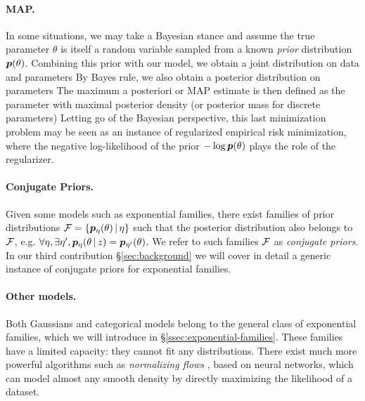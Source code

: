 \paragraph{MAP.}
In some situations, we may take a Bayesian stance and assume the true parameter $\theta$ is itself a random variable sampled from a known \emph{prior} distribution $\bm{p}(\theta)$.
Combining this prior with our model, we obtain a joint distribution on data and parameters
By Bayes rule, we also obtain a posterior distribution on parameters
The maximum a posteriori or MAP estimate is then defined as the parameter with maximal posterior density (or posterior mass for discrete parameters)
Letting go of the Bayesian perspective, this last minimization problem may be seen as an instance of regularized empirical risk minimization, where the negative log-likelihood of the prior $- \log \bm{p}(\theta)$ plays the role of the regularizer.

\paragraph{Conjugate Priors.}
Given some models such as exponential families, there exist families of prior distributions ${\mathcal F} = \{\bm{p}_\eta (\theta) \,\vert\, \eta\}$
such that the posterior distribution also belongs to ${\mathcal F}$,
e.g.  $\forall \eta, \exists \eta', \bm{p}_\eta (\theta \,\vert\, z) = \bm{p}_{\eta'}(\theta)$.
We refer to such families ${\mathcal F}$ as \emph{conjugate priors}.
In our third contribution \S\ref{sec:background} we will cover in detail a generic instance of conjugate priors for exponential families.

\paragraph{Other models.}
Both Gaussians and categorical models belong to the general class of exponential families, which we will introduce in \S\ref{ssec:exponential-families}.
These families have a limited capacity: they cannot fit any distributions.
There exist much more powerful algorithms such as \emph{normalizing flows} \citep{rezende2015variational}, based on neural networks, which can model almost any smooth density by directly maximizing the likelihood of a dataset.

